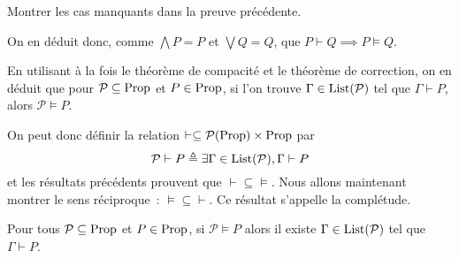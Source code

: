 \begin{exercise}
  Montrer les cas manquants dans la preuve précédente.
\end{exercise}

On en déduit donc, comme $\bigwedge P = P$ et $\bigvee Q = Q$, que
$P\vdash Q \implies P \vDash Q$.

\begin{remark}
  En utilisant à la fois le théorème de compacité et le théorème de correction,
  on en déduit que pour $\mathcal P\subseteq \operatorname{Prop}$ et $P\in \operatorname{Prop}$, si l'on
  trouve $\Gamma\in\operatorname{List}(\mathcal P)$ tel que $\Gamma\vdash P$, alors
  $\mathcal P \vDash P$.

  On peut donc définir la relation
  $\vdash \subseteq \mathcal{P}(\operatorname{Prop})\times \operatorname{Prop}$ par
  \[\mathcal P\vdash P \triangleq \exists \Gamma\in\operatorname{List}(\mathcal P),
  \Gamma\vdash P\]
  et les résultats précédents prouvent que $\vdash\subseteq\vDash$. Nous allons
  maintenant montrer le sens réciproque~: $\vDash\subseteq\vdash$. Ce résultat
  s'appelle la complétude.
\end{remark}

\begin{theorem}
  Pour tous $\mathcal P\subseteq \operatorname{Prop}$ et $P\in \operatorname{Prop}$, si $\mathcal P\vDash P$
  alors il existe $\Gamma\in\operatorname{List}(\mathcal P)$ tel que $\Gamma\vdash P$.
\end{theorem}


